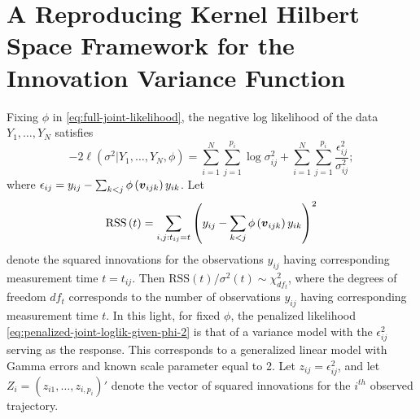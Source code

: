 
\section{A Reproducing Kernel Hilbert Space Framework for the Innovation Variance Function} \label{chapter-3-IV-modeling-section}

Fixing $\phi$ in \eqref{eq:full-joint-likelihood}, the negative log likelihood of the data $Y_1,\dots, Y_N$ satisfies
\begin{equation} \label{eq:penalized-joint-loglik-given-phi-2}
-2\ell\left(\sigma^2 \vert Y_1,\dots, Y_N ,\phi \right) =  \sum_{i = 1}^N \sum_{j = 1}^{p_i} \log \sigma^2_{ij}  + \sum_{i = 1}^N \sum_{j = 1}^{p_i} \frac {\epsilon_{ij}^2}{\sigma^2_{ij}};
\end{equation}
\noindent
where $\epsilon_{ij} =  y_{ij} - \sum_{k<j} \phi\left(\mbox{\boldmath $v$}_{ijk}\right) y_{ik}$. Let 
\begin{equation}
\mbox{RSS}\left( t \right) = \sum_{i,j:t_{ij}= t} \left( y_{ij} - \sum_{k<j} \phi\left(\mbox{\boldmath $v$}_{ijk}\right)  y_{ik}\right)^2
\end{equation}
\noindent
denote the squared innovations for the observations $y_{ij}$ having corresponding measurement time $t = t_{ij}$. Then $\mbox{RSS}\left( t \right)/\sigma^2\left(t\right) \sim \chi^2_{df_t}$, where the degrees of freedom $df_{t}$ corresponds to the number of observations $y_{ij}$ having corresponding measurement time $t$. In this light, for fixed $\phi$, the penalized likelihood \eqref{eq:penalized-joint-loglik-given-phi-2} is that of a variance model with the $\epsilon_{ij}^2$ serving as the response.  This corresponds to a generalized linear model with Gamma errors and known scale parameter equal to 2. Let $z_{ij} = \epsilon_{ij}^2$, and let $Z_{i} = \left(z_{i1},\dots, z_{i,p_i} \right)'$ denote the vector of squared innovations for the $i^{th}$ observed trajectory. 

\bigskip


